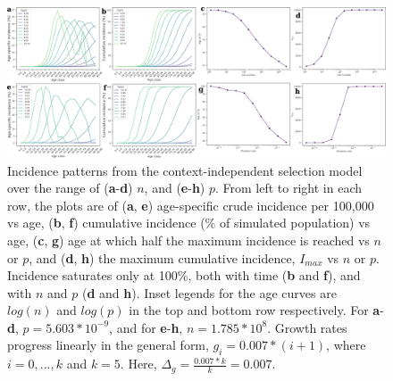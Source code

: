 \documentclass[12pt,onecolumn,twoside]{article}
\begin{document}
\begin{figure}[!ht]
	\centering
	\includegraphics[width=\linewidth]{fig3.png}
	\caption{Incidence patterns from the context-independent selection model over the range of (\textbf{a}-\textbf{d}) $n$, and (\textbf{e}-\textbf{h}) $p$. From left to right in each row, the plots are of (\textbf{a}, \textbf{e}) age-specific crude incidence per 100,000 vs age, (\textbf{b}, \textbf{f}) cumulative incidence (\% of simulated population) vs age, (\textbf{c}, \textbf{g}) age at which half the maximum incidence is reached vs $n$ or $p$, and (\textbf{d}, \textbf{h}) the maximum cumulative incidence, $I_{max}$ vs $n$ or $p$. Incidence saturates only at 100\%, both with time (\textbf{b} and \textbf{f}), and with $n$ and $p$ (\textbf{d} and \textbf{h}). Inset legends for the age curves are $log(n)$ and $log(p)$ in the top and bottom row respectively. For \textbf{a}-\textbf{d}, $p=5.603*10^{-9}$, and for \textbf{e}-\textbf{h}, $n=1.785*10^{8}$. Growth rates progress linearly in the general form, $g_{i}=0.007*(i+1)$, where $i=0,...,k$ and $k=5$. Here, $\Delta_{g}=\frac{0.007*k}{k}=0.007$.}
	\label{fig3}
\end{figure}
\end{document}
